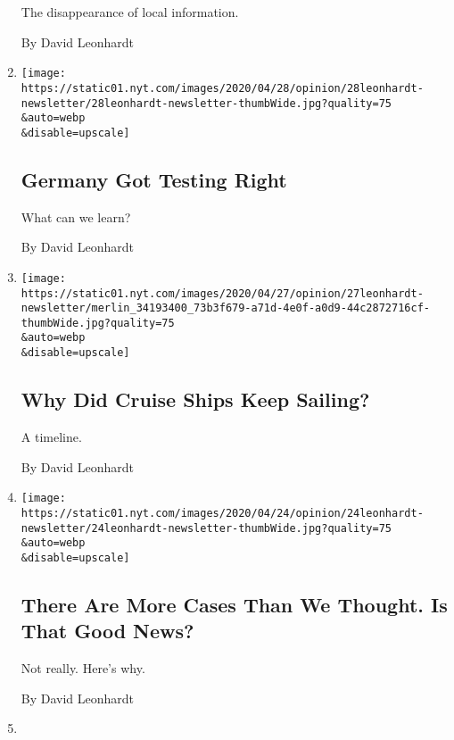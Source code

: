 \begin{enumerate}
  The disappearance of local information.

  By David Leonhardt
\item
  \href{/2020/04/28/opinion/coronavirus-testing-united-states.html}{}

  \texttt{[image: https://static01.nyt.com/images/2020/04/28/opinion/28leonhardt-newsletter/28leonhardt-newsletter-thumbWide.jpg?quality=75\\\&auto=webp\\\&disable=upscale]}

  \hypertarget{germany-got-testing-right}{%
  \subsection{Germany Got Testing
  Right}\label{germany-got-testing-right}}

  What can we learn?

  By David Leonhardt
\item
  \href{/2020/04/27/opinion/coronavirus-cruise-celebrity-eclipse.html}{}

  \texttt{[image: https://static01.nyt.com/images/2020/04/27/opinion/27leonhardt-newsletter/merlin\_34193400\_73b3f679-a71d-4e0f-a0d9-44c2872716cf-thumbWide.jpg?quality=75\\\&auto=webp\\\&disable=upscale]}

  \hypertarget{why-did-cruise-ships-keep-sailing}{%
  \subsection{Why Did Cruise Ships Keep
  Sailing?}\label{why-did-cruise-ships-keep-sailing}}

  A timeline.

  By David Leonhardt
\item
  \href{/2020/04/24/opinion/coronavirus-antibodies-test.html}{}

  \texttt{[image: https://static01.nyt.com/images/2020/04/24/opinion/24leonhardt-newsletter/24leonhardt-newsletter-thumbWide.jpg?quality=75\\\&auto=webp\\\&disable=upscale]}

  \hypertarget{there-are-more-cases-than-we-thought-is-that-good-news}{%
  \subsection{There Are More Cases Than We Thought. Is That Good
  News?}\label{there-are-more-cases-than-we-thought-is-that-good-news}}

  Not really. Here's why.

  By David Leonhardt
\item
  \href{/2020/04/23/opinion/nfl-draft.html}{}


\end{enumerate}
